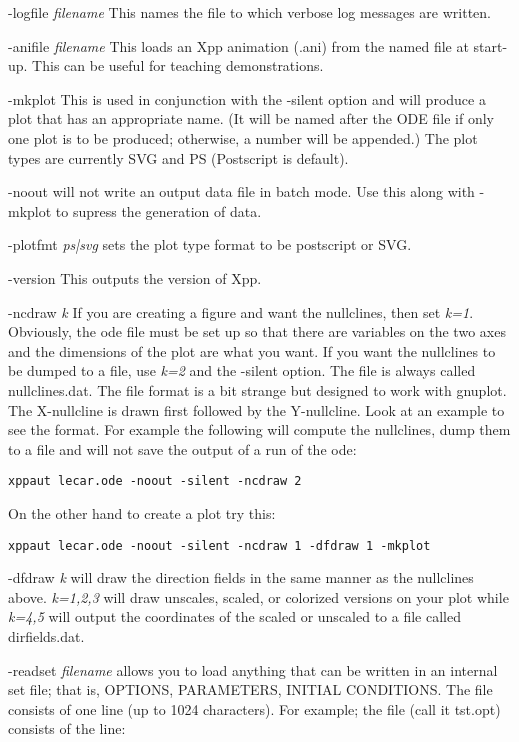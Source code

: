 \begin{description}
\item{-logfile \emph{filename}} This names the file to which verbose log messages are written. 
\item{-anifile \emph{filename}} This loads an Xpp animation (.ani) from the named file at start-up.  This can be useful for
teaching demonstrations.
\item{-mkplot} This is used in conjunction with the -silent option and will produce a plot that has an appropriate name. (It will be named after the ODE file if only one plot is to be produced; otherwise, a number will be appended.) The plot types are currently SVG and PS (Postscript is default).
\item {-noout} will not write an output data file in batch mode. Use this along with -mkplot to supress the generation of data.
\item {-plotfmt} \emph{ps|svg} sets the plot type format to be  postscript or SVG.
\item{-version} This outputs the version of Xpp.
\item {-ncdraw \emph{k}} If you are creating a figure and want the nullclines, then set {\em k=1}. Obviously, the ode file must be set up so that there are variables on the two axes and the dimensions of the plot are what you want.  If you want the nullclines to be dumped to a file, use {\em k=2} and the {\ttfamily -silent} option.  The file is always called {\ttfamily nullclines.dat}. The file format is a bit strange but designed to work with gnuplot. The X-nullcline is drawn first followed by the Y-nullcline. Look at an example to see the format. For example the following will compute the nullclines, dump them to a file and will not save the output of a run of the ode:
\begin{verbatim}
xppaut lecar.ode -noout -silent -ncdraw 2
\end{verbatim}  
On the other hand to create a plot try this:
\begin{verbatim}
xppaut lecar.ode -noout -silent -ncdraw 1 -dfdraw 1 -mkplot 
\end{verbatim}
\item {-dfdraw \emph{k}} will draw the direction fields in the same manner as the nullclines above. \emph{k=1,2,3} will draw unscales, scaled, or colorized versions on your plot  while \emph{k=4,5} will output the coordinates of the scaled or unscaled to a file called {\ttfamily dirfields.dat}. 
\item {-readset \emph{filename}} allows you to load anything that can be written in an internal set file; that is, OPTIONS, PARAMETERS, INITIAL CONDITIONS.  The file consists of one line (up to 1024 characters). For example; the file (call it {\ttfamily tst.opt}) consists of the line:

\end{description}
